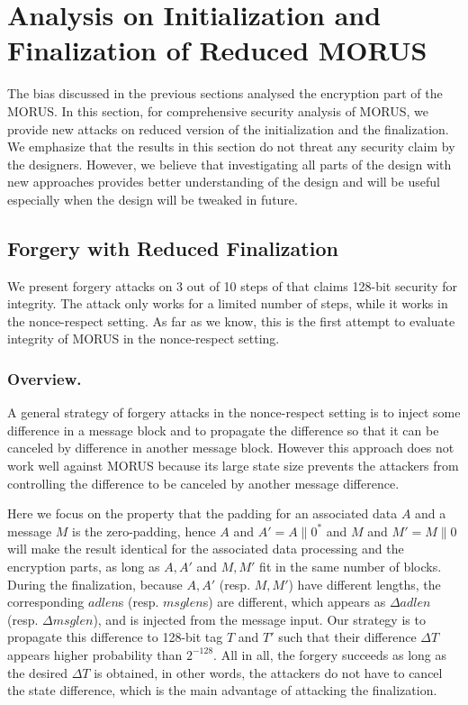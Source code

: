 \section{Analysis on Initialization and Finalization of Reduced MORUS}
\label{sec/IniFin}

The bias discussed in the previous sections analysed the encryption part of the MORUS. In this section, for comprehensive security analysis of MORUS, we provide new attacks on reduced version of the initialization and the finalization. We emphasize that the results in this section do not threat any security claim by the designers. However, we believe that investigating all parts of the design with new approaches provides better understanding of the design and will be useful especially when the design will be tweaked in future.

\subsection{Forgery with Reduced Finalization}
\label{subsec/Fin}
We present forgery attacks on 3 out of 10 steps of  that claims 128-bit security for integrity. The attack only works for a limited number of steps, while it works in the nonce-respect setting. As far as we know, this is the first attempt to evaluate integrity of MORUS in the nonce-respect setting.

\subsubsection{Overview.}
A general strategy of forgery attacks in the nonce-respect setting is to inject some difference in a message block and to propagate the difference so that it can be canceled by difference in another message block. However this approach does not work well against MORUS because its large state size prevents the attackers from controlling the difference to be canceled by another message difference.

Here we focus on the property that the padding for an associated data $A$ and a message $M$ is the zero-padding, hence $A$ and $A'=A\|0^*$ and $M$ and $M'=M\|0$ will make the result identical for the associated data processing and the encryption parts, as long as $A,A'$ and $M,M'$ fit in the same number of blocks. During the finalization, because $A,A'$ (resp. $M,M'$) have different lengths, the corresponding $adlen$s (resp. $msglen$s) are different, which appears as $\Delta adlen$ (resp. $\Delta msglen$), and is injected from the message input. Our strategy is to propagate this difference to 128-bit tag $T$ and $T'$ such that their difference $\Delta T$ appears higher probability than $2^{-128}$. All in all, the forgery succeeds as long as the desired $\Delta T$ is obtained, in other words, the attackers do not have to cancel the state difference, which is the main advantage of attacking the finalization.

